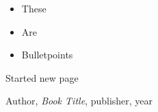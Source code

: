 \documentclass{report}
\begin{document}

\begin{itemize}
	\item These
	\item Are
	\item Bulletpoints
\end{itemize}


\newpage

\par Started new page


\begin{thebibliography}{9}

  Author,
  \emph{Book Title},
  publisher,
  year

\end{thebibliography}
\end{document}
